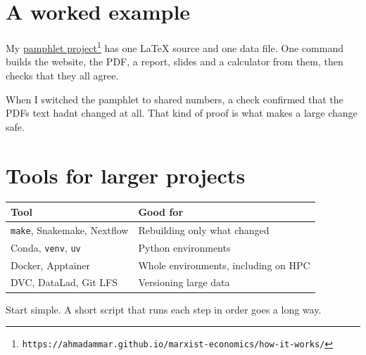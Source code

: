 \section{A worked example}\label{a-worked-example}

My \href{https://ahmadammar.github.io/marxist-economics/how-it-works/}{pamphlet project}\footnote{\texttt{https://ahmadammar.github.io/marxist-economics/how-it-works/}} has one LaTeX source and one data file. One command builds the website, the PDF, a report, slides and a calculator from them, then checks that they all agree.

When I switched the pamphlet to shared numbers, a check confirmed that the PDF\textquotesingle s text hadn\textquotesingle t changed at all. That kind of proof is what makes a large change safe.

\section{Tools for larger projects}\label{tools-for-larger-projects}

{\def\LTcaptype{none} %
\begin{longtable}[]{@{}ll@{}}
\toprule\noalign{}
Tool & Good for \\
\midrule\noalign{}
\endhead
\bottomrule\noalign{}
\endlastfoot
\texttt{make}, Snakemake, Nextflow & Rebuilding only what changed \\
Conda, \texttt{venv}, \texttt{uv} & Python environments \\
Docker, Apptainer & Whole environments, including on HPC \\
DVC, DataLad, Git LFS & Versioning large data \\
\end{longtable}
}

Start simple. A short script that runs each step in order goes a long way.

